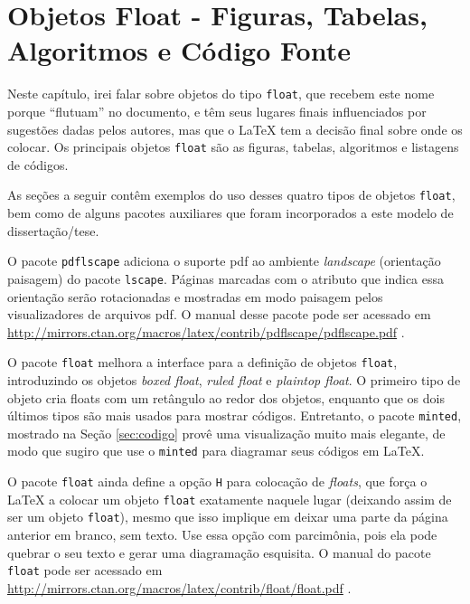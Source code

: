 \chapter{Objetos Float - Figuras, Tabelas, Algoritmos e Código Fonte}\label{cap:float}

Neste capítulo, irei falar sobre objetos do tipo \texttt{float}, que recebem este nome porque ``flutuam'' no documento, e têm seus lugares finais influenciados por sugestões dadas pelos autores, mas que o \LaTeX{} tem a decisão final sobre onde os colocar. Os principais objetos \texttt{float} são as figuras, tabelas, algoritmos e listagens de códigos. 

As seções a seguir contêm exemplos do uso desses quatro tipos de objetos \texttt{float}, bem como de alguns pacotes auxiliares que foram incorporados a este modelo de dissertação/tese.

O pacote \texttt{pdflscape} adiciona o suporte \gls{pdf} ao ambiente \textit{landscape} (orientação paisagem) do pacote \texttt{lscape}. Páginas marcadas com o atributo que indica essa orientação serão rotacionadas e mostradas em modo paisagem pelos visualizadores de arquivos \gls{pdf}. O manual desse pacote pode ser acessado em \url{http://mirrors.ctan.org/macros/latex/contrib/pdflscape/pdflscape.pdf} \parencite{pdflscape}.

O pacote \texttt{float} melhora a interface para a definição de objetos \texttt{float}, introduzindo os objetos \textit{boxed float}, \textit{ruled float} e \textit{plaintop float}. O primeiro tipo de objeto cria floats com um retângulo ao redor dos objetos, enquanto que os dois últimos tipos são mais usados para mostrar códigos. Entretanto, o pacote \texttt{minted}, mostrado na Seção \ref{sec:codigo} provê uma visualização muito mais elegante, de modo que sugiro que use o \texttt{minted} para diagramar seus códigos em \LaTeX{}.

O pacote \texttt{float} ainda define a opção \texttt{H} para colocação de \textit{floats}, que força o \LaTeX{} a colocar um objeto \texttt{float} exatamente naquele lugar (deixando assim de ser um objeto \texttt{float}), mesmo que isso implique em deixar uma parte da página anterior em branco, sem texto. Use essa opção com parcimônia, pois ela pode quebrar o seu texto e gerar uma diagramação esquisita. O manual do pacote \texttt{float} pode ser acessado em \url{http://mirrors.ctan.org/macros/latex/contrib/float/float.pdf} \parencite{float}.

